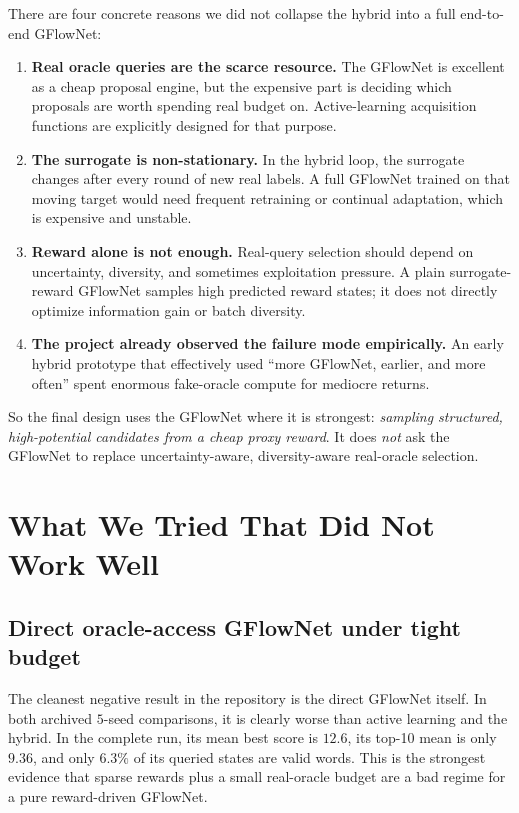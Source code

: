 \documentclass[10pt]{article}
\begin{document}
There are four concrete reasons we did not collapse the hybrid into a full end-to-end GFlowNet:
\begin{enumerate}
    \item \textbf{Real oracle queries are the scarce resource.} The GFlowNet is excellent as a cheap proposal engine, but the expensive part is deciding which proposals are worth spending real budget on. Active-learning acquisition functions are explicitly designed for that purpose.
    \item \textbf{The surrogate is non-stationary.} In the hybrid loop, the surrogate changes after every round of new real labels. A full GFlowNet trained on that moving target would need frequent retraining or continual adaptation, which is expensive and unstable.
    \item \textbf{Reward alone is not enough.} Real-query selection should depend on uncertainty, diversity, and sometimes exploitation pressure. A plain surrogate-reward GFlowNet samples high predicted reward states; it does not directly optimize information gain or batch diversity.
    \item \textbf{The project already observed the failure mode empirically.} An early hybrid prototype that effectively used ``more GFlowNet, earlier, and more often'' spent enormous fake-oracle compute for mediocre returns.
\end{enumerate}

So the final design uses the GFlowNet where it is strongest: \emph{sampling structured, high-potential candidates from a cheap proxy reward}. It does \emph{not} ask the GFlowNet to replace uncertainty-aware, diversity-aware real-oracle selection.

\section{What We Tried That Did Not Work Well}
\subsection{Direct oracle-access GFlowNet under tight budget}
The cleanest negative result in the repository is the direct GFlowNet itself. In both archived \(5\)-seed comparisons, it is clearly worse than active learning and the hybrid. In the complete run, its mean best score is \(12.6\), its top-10 mean is only \(9.36\), and only \(6.3\%\) of its queried states are valid words. This is the strongest evidence that sparse rewards plus a small real-oracle budget are a bad regime for a pure reward-driven GFlowNet.
\end{document}
